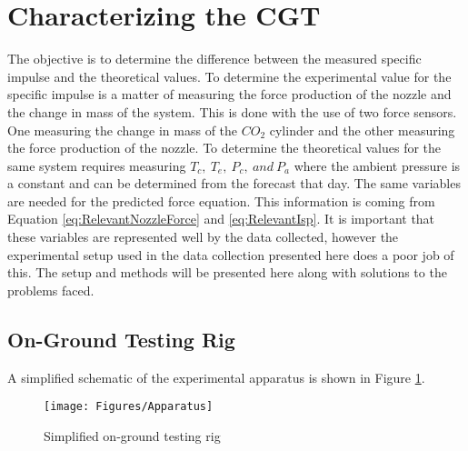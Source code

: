 \section{Characterizing the CGT}
The objective is to determine the difference between the measured specific impulse and the theoretical values. To determine the experimental value for the specific impulse is a matter of measuring the force production of the nozzle and the change in mass of the system. This is done with the use of two force sensors. One measuring the change in mass of the $CO_2$ cylinder and the other measuring the force production of the nozzle. To determine the theoretical values for the same system requires measuring $T_c,\ T_e,\ P_c,\ and\ P_a$ where the ambient pressure is a constant and can be determined from the forecast that day. The same variables are needed for the predicted force equation. This information is coming from Equation \ref{eq:RelevantNozzleForce} and \ref{eq:RelevantIsp}. It is important that these variables are represented well by the data collected, however the experimental setup used in the data collection presented here does a poor job of this. The setup and methods will be presented here along with solutions to the problems faced. 
\subsection{On-Ground Testing Rig}
A simplified schematic of the experimental apparatus is shown in Figure \ref{fig:ApparatusSchem}.
\begin{figure}[h!]
\centering
\texttt{[image: Figures/Apparatus]}
\caption{Simplified on-ground testing rig}
\label{fig:ApparatusSchem}
\end{figure}
